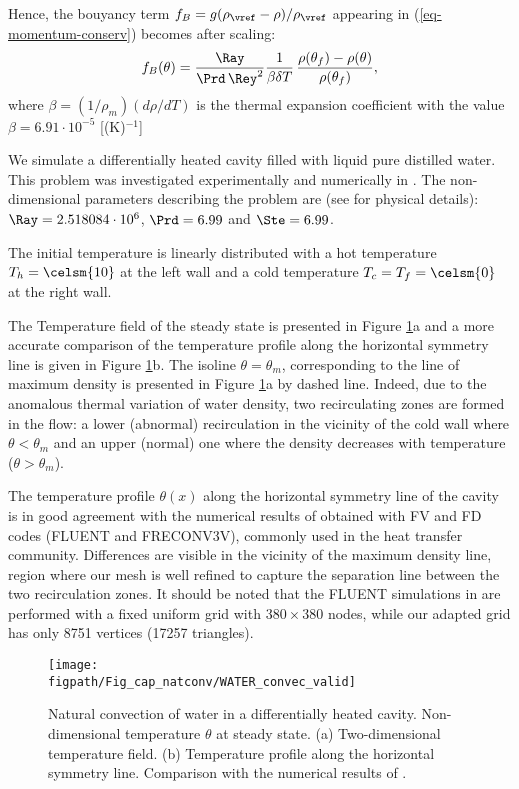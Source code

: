 Hence, the bouyancy term $f_B = g(\rho_\vref-\rho)/\rho_\vref$ appearing in (\ref{eq-momentum-conserv})  becomes after scaling:
\begin{equation}
f_B(\theta) = \frac{\Ray}{\Prd \, \Rey^2} \frac{1}{\beta \delta T}\, \frac{\rho(\theta_f)-\rho(\theta)}{\rho(\theta_f)},
\label{eq-fBnonlin}
\end{equation}
where $\beta=(1/\rho_m) \left(d\rho/dT\right)$ is the thermal expansion coefficient with the value \cite{Scanlon2004} $\beta=6.91 \cdot 10^{-5}$ [(K)$^{-1}$]

We simulate a differentially heated cavity filled with liquid pure distilled water. 
This problem was investigated experimentally and numerically in \cite{Giangi-2000,Kowalewski-1999,Kowalewski-2003}.
The non-dimensional parameters describing the problem are (see \cite{Kowalewski-2003} for physical details): $\Ray=2.518084\cdot 10^{6}$, $\Prd=6.99$ and $\Ste = 6.99$.

The initial temperature is linearly distributed with a hot temperature $T_h =\celsm{10}$ at the left wall and a cold temperature $T_c=T_f=\celsm{0}$ at the right wall.

The Temperature field of the steady state is presented in Figure \ref{fig-T1w-isoT}a and a more accurate comparison of the temperature profile along the horizontal symmetry line is given in Figure \ref{fig-T1w-isoT}b. 
The isoline $\theta = \theta_m$, corresponding to the line of maximum density is presented in Figure \ref{fig-T1w-isoT}a by dashed line.
Indeed, due to the anomalous thermal variation of water density, two recirculating zones are formed in the flow: a lower (abnormal) recirculation  in the vicinity of the cold wall where $\theta<\theta_m$ and an upper (normal) one where the density decreases with temperature ($\theta>\theta_m$).

The temperature profile $\theta(x)$ along the horizontal symmetry line of the cavity is in good agreement with the numerical results   of \cite{Kowalewski-2003} obtained with FV and FD codes (FLUENT and FRECONV3V), commonly used in the heat transfer community. Differences are visible in the vicinity of the maximum density line, region where our mesh is well refined to capture the separation line between the two recirculation zones. It should be noted that the FLUENT simulations in \cite{Kowalewski-2003} are performed with a fixed uniform grid with $380\times380$ nodes, while our adapted grid has only 8751 vertices (17257 triangles).

\begin{figure}
	\begin{center}
		\texttt{[image: \\figpath/Fig\_cap\_natconv/WATER\_convec\_valid]}
	\end{center}
	\caption{Natural convection of water in a differentially heated cavity. Non-dimensional temperature $\theta$ at steady state. (a) Two-dimensional temperature  field. (b) Temperature profile along the horizontal symmetry line. Comparison with the numerical results of \cite{Kowalewski-2003}.}
	\label{fig-T1w-isoT} %
\end{figure}


